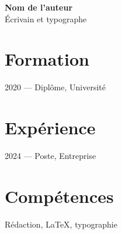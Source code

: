 \documentclass[11pt]{article}
\begin{document}
{\Large\bfseries Nom de l'auteur}\\[4pt]
{\large Écrivain et typographe}

\vspace{8pt}

\section*{Formation}
2020 — Diplôme, Université

\section*{Expérience}
2024 — Poste, Entreprise

\section*{Compétences}
Rédaction, LaTeX, typographie
\end{document}
